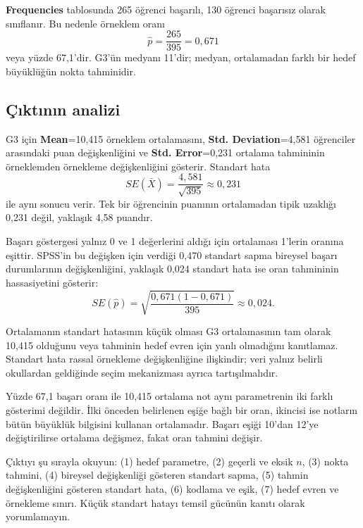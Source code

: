 \textbf{Frequencies} tablosunda 265 öğrenci başarılı, 130 öğrenci başarısız
olarak sınıflanır. Bu nedenle örneklem oranı
\[
\hat p=\frac{265}{395}=0{,}671
\]
veya yüzde 67,1'dir. G3'ün medyanı 11'dir; medyan, ortalamadan farklı bir
hedef büyüklüğün nokta tahminidir.

\subsection{Çıktının analizi}

G3 için \textbf{Mean}=10,415 örneklem ortalamasını, \textbf{Std.
Deviation}=4,581 öğrenciler arasındaki puan değişkenliğini ve \textbf{Std.
Error}=0,231 ortalama tahmininin örneklemden örnekleme değişkenliğini gösterir.
Standart hata
\[
SE(\bar X)=\frac{4{,}581}{\sqrt{395}}\approx0{,}231
\]
ile aynı sonucu verir. Tek bir öğrencinin puanının ortalamadan tipik uzaklığı
0,231 değil, yaklaşık 4,58 puandır.

Başarı göstergesi yalnız 0 ve 1 değerlerini aldığı için ortalaması 1'lerin
oranına eşittir. SPSS'in bu değişken için verdiği 0,470 standart sapma bireysel
başarı durumlarının değişkenliğini, yaklaşık 0,024 standart hata ise oran
tahmininin hassasiyetini gösterir:
\[
SE(\hat p)=\sqrt{\frac{0{,}671(1-0{,}671)}{395}}
\approx0{,}024.
\]

Ortalamanın standart hatasının küçük olması G3 ortalamasının tam olarak 10,415
olduğunu veya tahminin hedef evren için yanlı olmadığını kanıtlamaz. Standart
hata rassal örnekleme değişkenliğine ilişkindir; veri yalnız belirli okullardan
geldiğinde seçim mekanizması ayrıca tartışılmalıdır.

\begin{mistakebox}
Yüzde 67,1 başarı oranı ile 10,415 ortalama not aynı parametrenin iki farklı
gösterimi değildir. İlki önceden belirlenen eşiğe bağlı bir oran, ikincisi ise
notların bütün büyüklük bilgisini kullanan ortalamadır. Başarı eşiği 10'dan
12'ye değiştirilirse ortalama değişmez, fakat oran tahmini değişir.
\end{mistakebox}

\begin{outputguidebox}
Çıktıyı şu sırayla okuyun: (1) hedef parametre, (2) geçerli ve eksik $n$,
(3) nokta tahmini, (4) bireysel değişkenliği gösteren standart sapma,
(5) tahmin değişkenliğini gösteren standart hata, (6) kodlama ve eşik,
(7) hedef evren ve örnekleme sınırı. Küçük standart hatayı temsil gücünün
kanıtı olarak yorumlamayın.
\end{outputguidebox}

